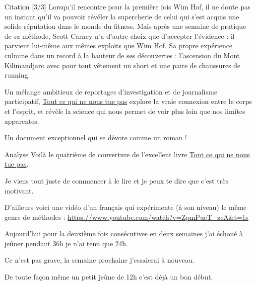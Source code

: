 \documentclass[presentation]{beamer}
\begin{document}
\begin{frame}[label={sec:orgf50c438}]{Citation [3/3]}
Lorsqu'il rencontre pour la première fois Wim Hof, il ne doute pas un instant qu'il va pouvoir révéler la supercherie de celui qui s'est acquis une solide réputation dans le monde du fitness. Mais après une semaine de pratique de sa méthode, Scott Carney n'a d'autre choix que d'accepter l'évidence : il parvient lui-même aux mêmes exploits que Wim Hof. Sa propre expérience culmine dans un record à la hauteur de ses découvertes : l'ascension du Mont Kilimandjaro avec pour tout vêtement un short et une paire de chaussures de running.

Un mélange ambitieux de reportages d'investigation et de journalisme participatif, \href{https://amzn.to/2Uveetk}{Tout ce qui ne nous tue pas} explore la vraie connexion entre le corps et l'esprit, et révèle la science qui nous permet de voir plus loin que nos limites apparentes.

Un document exceptionnel qui se dévore comme un roman !
\end{frame}


\begin{frame}[label={sec:orgdea16cb}]{Analyse}
Voilà le quatrième de couverture de l'excellent livre \href{https://amzn.to/2Uveetk}{Tout ce qui ne nous tue pas}.



Je viens tout juste de commencer à le lire et je peux te dire que c'est très motivant. 



D'ailleurs voici une vidéo d'un français qui expérimente (à son niveau) le même genre de méthodes : \url{https://www.youtube.com/watch?v=ZpmPucT\_zcA\&t=1s}



Aujourd'hui pour la deuxième fois consécutives en deux semaines j'ai échoué à jeûner pendant 36h je n'ai tenu que 24h.



Ce n'est pas grave, la semaine prochaine j'essaierai à nouveau.



De toute façon même un petit jeûne de 12h c'est déjà un bon début.
\end{frame}
\end{document}
